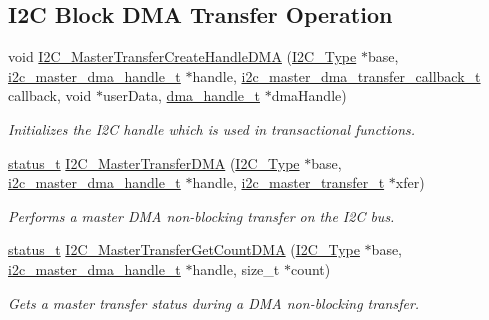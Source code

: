 \subsection*{I2C Block D\+MA Transfer Operation}
\begin{DoxyCompactItemize}
\item 
void \mbox{\hyperlink{group__i2c__dma__driver_ga83d8463e42b12e7b797a3f928f51b3cb}{I2\+C\+\_\+\+Master\+Transfer\+Create\+Handle\+D\+MA}} (\mbox{\hyperlink{struct_i2_c___type}{I2\+C\+\_\+\+Type}} $\ast$base, \mbox{\hyperlink{group__i2c__dma__driver_gab13fb9488effeb728350d3bf8d6c784a}{i2c\+\_\+master\+\_\+dma\+\_\+handle\+\_\+t}} $\ast$handle, \mbox{\hyperlink{group__i2c__dma__driver_gaa04081e50be4d84531d2653c2db6c0f9}{i2c\+\_\+master\+\_\+dma\+\_\+transfer\+\_\+callback\+\_\+t}} callback, void $\ast$user\+Data, \mbox{\hyperlink{group__dma_gac4a65788d7e5762d16a41a50b2cd7956}{dma\+\_\+handle\+\_\+t}} $\ast$dma\+Handle)
\begin{DoxyCompactList}\small\item\em Initializes the I2C handle which is used in transactional functions. \end{DoxyCompactList}\item 
\mbox{\hyperlink{group__ksdk__common_gaaabdaf7ee58ca7269bd4bf24efcde092}{status\+\_\+t}} \mbox{\hyperlink{group__i2c__dma__driver_ga8643ea43510b8d97b94db05766444cd2}{I2\+C\+\_\+\+Master\+Transfer\+D\+MA}} (\mbox{\hyperlink{struct_i2_c___type}{I2\+C\+\_\+\+Type}} $\ast$base, \mbox{\hyperlink{group__i2c__dma__driver_gab13fb9488effeb728350d3bf8d6c784a}{i2c\+\_\+master\+\_\+dma\+\_\+handle\+\_\+t}} $\ast$handle, \mbox{\hyperlink{group__i2c__driver_ga0e25c3c153992361c8d359a86b70d3c6}{i2c\+\_\+master\+\_\+transfer\+\_\+t}} $\ast$xfer)
\begin{DoxyCompactList}\small\item\em Performs a master D\+MA non-\/blocking transfer on the I2C bus. \end{DoxyCompactList}\item 
\mbox{\hyperlink{group__ksdk__common_gaaabdaf7ee58ca7269bd4bf24efcde092}{status\+\_\+t}} \mbox{\hyperlink{group__i2c__dma__driver_ga4bf5fbe48e6776cbd6ef017b6785f745}{I2\+C\+\_\+\+Master\+Transfer\+Get\+Count\+D\+MA}} (\mbox{\hyperlink{struct_i2_c___type}{I2\+C\+\_\+\+Type}} $\ast$base, \mbox{\hyperlink{group__i2c__dma__driver_gab13fb9488effeb728350d3bf8d6c784a}{i2c\+\_\+master\+\_\+dma\+\_\+handle\+\_\+t}} $\ast$handle, size\+\_\+t $\ast$count)
\begin{DoxyCompactList}\small\item\em Gets a master transfer status during a D\+MA non-\/blocking transfer. \end{DoxyCompactList}\item 

\end{DoxyCompactItemize}
